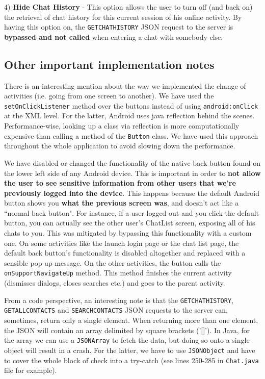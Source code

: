 4) \textbf{Hide Chat History} - This option allows the user to turn off (and back on) the retrieval of chat history for this current session of his online activity. By having this option on, the \verb|GETCHATHISTORY| JSON request to the server is \textbf{bypassed and not called} when entering a chat with somebody else.

\subsection{Other important implementation notes}

There is an interesting mention about the way we implemented the change of activities (i.e. going from one screen to another). We have used the \verb|setOnClickListener| method over the buttons instead of using \verb|android:onClick| at the XML level. For the latter, Android uses java reflection behind the scenes. Performance-wise, looking up a class via reflection is more computationally expensive than calling a method of the \verb|Button| class. We have used this approach throughout the whole application to avoid slowing down the performance.

We have disabled or changed the functionality of the native back button found on the lower left side of any Android device. This is important in order to \textbf{not allow the user to see sensitive information from other users that we're previously logged into the device}. This happens because the default Android button shows you \textbf{what the previous screen was}, and doesn't act like a “normal back button". For instance, if a user logged out and you click the default button, you can actually see the other user’s ChatList screen, exposing all of his chats to you. This was mitigated by bypassing this functionality with a custom one. On some activities like the launch login page or the chat list page, the default back button's functionality is disabled altogether and replaced with a sensible pop-up message. On the other activities, the button calls the \verb|onSupportNavigateUp| method. This method finishes the current activity (dismisses dialogs, closes searches etc.) and goes to the parent activity.

From a code perspective, an interesting note is that the \verb|GETCHATHISTORY|, \verb|GETALLCONTACTS| and \verb|SEARCHCONTACTS| JSON requests to the server can, sometimes, return only a single element. When returning more than one element, the JSON will contain an array delimited by square brackets ('[]'). In Java, for the array we can use a \verb|JSONArray| to fetch the data, but doing so onto a single object will result in a crash. For the latter, we have to use \verb|JSONObject| and have to cover the whole block of check into a try-catch (see lines 250-285 in \verb|Chat.java| file for example).

